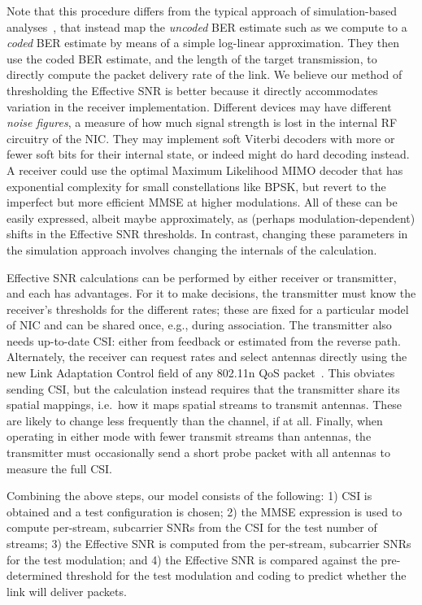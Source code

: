 Note that this procedure differs from the typical approach of simulation-based analyses~\cite{Kant_fla, Liu_EESM, Nortel_3g}, that instead map the \emph{uncoded} BER estimate such as we compute to a \emph{coded} BER estimate by means of a simple log-linear approximation. They then use the coded BER estimate, and the length of the target transmission, to directly compute the packet delivery rate of the link. We believe our method of thresholding the Effective SNR is better because it directly accommodates variation in the receiver implementation. Different devices may have different \emph{noise figures}, a measure of how much signal strength is lost in the internal RF circuitry of the NIC\@. They may implement soft Viterbi decoders with more or fewer soft bits for their internal state, or indeed might do hard decoding instead. A receiver could use the optimal Maximum Likelihood MIMO decoder that has exponential complexity for small constellations like BPSK, but revert to the imperfect but more efficient MMSE at higher modulations. All of these can be easily expressed, albeit maybe approximately, as (perhaps modulation-dependent) shifts in the Effective SNR thresholds. In contrast, changing these parameters in the simulation approach involves changing the internals of the calculation.

 Effective SNR calculations can be performed by either receiver or transmitter, and each has advantages. For it to make decisions, the transmitter must know the receiver's thresholds for the different rates; these are fixed for a particular model of NIC and can be shared once, e.g., during association. The transmitter also needs up-to-date CSI: either from feedback or estimated from the reverse path. Alternately, the receiver can request rates and select antennas directly using the new Link Adaptation Control field of any 802.11n QoS packet~\cite[\S7.1.3.5a]{80211n}. This obviates sending CSI, but the calculation instead requires that the transmitter share its spatial mappings, i.e.\ how it maps spatial streams to transmit antennas. These are likely to change less frequently than the channel, if at all. Finally, when operating in either mode with fewer transmit streams than antennas, the transmitter must occasionally send a short probe packet with all antennas to measure the full CSI\@.

 Combining the above steps, our model consists of the following: 1) CSI is obtained and a test configuration is chosen; 2) the MMSE expression is used to compute per-stream, subcarrier SNRs from the CSI for the test number of streams; 3) the Effective SNR is computed from the per-stream, subcarrier SNRs for the test modulation; and 4) the Effective SNR is compared against the pre-determined threshold for the test modulation and coding to predict whether the link will deliver packets.

